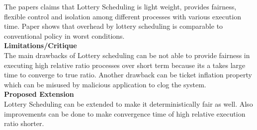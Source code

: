 \documentclass[a4paper, 10pt]{article}
\begin{document}
The papers claims that Lottery Scheduling is light weight, provides fairness, flexible control and isolation among different processes with various execution time. Paper shows that overhead by lottery scheduling is comparable to conventional policy in worst conditions.\\

\noindent
\large\textbf{Limitations/Critique}\\
The main drawbacks of Lottery scheduling can be not able to provide fairness in executing high relative ratio processes over short term because its a takes large time to converge to true ratio. Another drawback can be ticket inflation property which can be misused by malicious application to clog the system.\\ 

\noindent
\large\textbf{Proposed Extension}\\
Lottery Scheduling can be extended to make it deterministically fair as well. Also improvements can be done to make convergence time of high relative execution ratio shorter.
\end{document}
